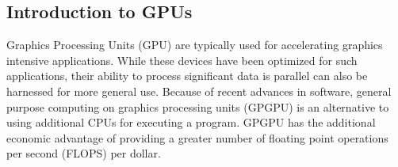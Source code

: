 \subsection{Introduction to GPUs}
\label{GPU}
Graphics Processing Units (GPU) are typically used for accelerating graphics intensive applications. While these devices have been optimized for such applications, their ability to process significant data is parallel can also be harnessed for more general use. Because of recent advances in software, general purpose computing on graphics processing units (GPGPU) is an alternative to using additional CPUs for executing a program. GPGPU has the additional economic advantage of providing a greater number of floating point operations per second (FLOPS) per dollar. 
